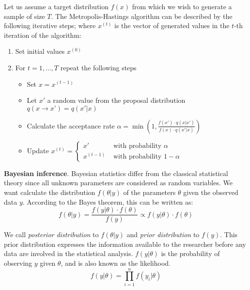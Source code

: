 \documentclass[11pt,fleqn]{book} %
\begin{document}
\begin{algorithm}
Let us assume a target distribution $f(x)$ from which we wish to generate a 
sample of size $T$. The Metropolis-Hastings algorithm can be described by the 
following iterative steps; where $x^{(t)}$ is the vector of generated values 
in the $t$-th iteration of the algorithm:
\begin{enumerate}
\item Set initial values $x^{(0)}$
\item For $t=1,\dots,T$ repeat the following steps
\begin{itemize}
\item Set $x=x^{(t-1)}$
\item Let $x'$ a random value from the proposal distribution $q(x \to x’)=q(x'|x)$
\item Calculate the acceptance rate 
      $\alpha = \min\left(1,\frac{f(x') \cdot q(x|x')}{f(x) \cdot q(x'|x)}\right)$
\item Update $x^{(t)}=\left\{
  \begin{array}{ll}
  x' & \textrm{ with probability } \alpha \\
  x^{(t-1)}  & \textrm{ with probability } 1-\alpha
  \end{array}\right.$ 
\end{itemize}
\end{enumerate}
\end{algorithm}



\textbf{Bayesian inference}.
Bayesian statistics differ from the classical statistical theory since all 
unknown parameters are considered as random variables.
We want calculate the distribution $f(\theta|y)$ of the parameters $\theta$ 
given the observed data $y$. According to the Bayes theorem, this can be 
written as:
\begin{displaymath}
f(\theta|y) = \frac{f(y|\theta) \cdot f(\theta)}{f(y)} \propto f(y|\theta) \cdot f(\theta)
\end{displaymath}

We call \emph{posterior distribution} to $f(\theta|y)$ and \emph{prior distribution} 
to $f(y)$. This prior distribution expresses the information available to the 
researcher before any data are involved in the statistical analysis. 
$f(y|\theta)$ is the probability of observing $y$ given $\theta$, and is also 
known as the likelihood.
\begin{displaymath}
f(y|\theta) = \prod_{i=1}^n f(y_i|\theta)
\end{displaymath}
\end{document}
